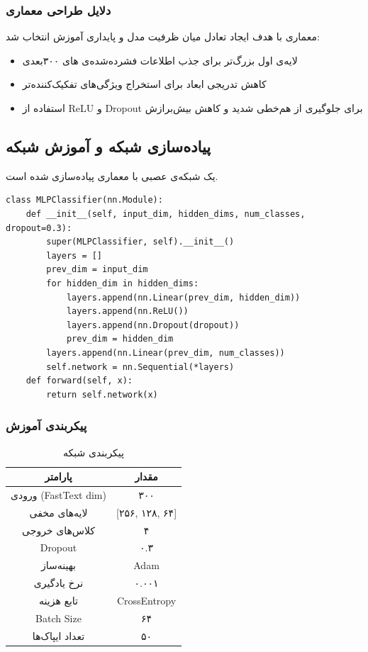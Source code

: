 \documentclass[12pt,a4paper]{article}
\begin{document}
\subsubsection{دلایل طراحی معماری }
معماری \lr{[256, 128, 64]} با هدف ایجاد تعادل میان ظرفیت مدل و پایداری آموزش انتخاب شد:
\begin{itemize}
\item لایه‌ی اول بزرگ‌تر برای جذب اطلاعات فشرده‌شده‌ی های ۳۰۰بعدی
\item کاهش تدریجی ابعاد برای استخراج ویژگی‌های تفکیک‌کننده‌تر
\item استفاده از ReLU و Dropout برای جلوگیری از هم‌خطی شدید و کاهش بیش‌برازش
\end{itemize}

\subsection{پیاده‌سازی شبکه و آموزش شبکه}
یک شبکه‌ی عصبی  با معماری \lr{[256, 128, 64]} پیاده‌سازی شده است.

\begin{lstlisting}[caption=کد مدل \lr{MLP}]
class MLPClassifier(nn.Module):
    def __init__(self, input_dim, hidden_dims, num_classes, dropout=0.3):
        super(MLPClassifier, self).__init__()
        layers = []
        prev_dim = input_dim
        for hidden_dim in hidden_dims:
            layers.append(nn.Linear(prev_dim, hidden_dim))
            layers.append(nn.ReLU())
            layers.append(nn.Dropout(dropout))
            prev_dim = hidden_dim
        layers.append(nn.Linear(prev_dim, num_classes))
        self.network = nn.Sequential(*layers)
    def forward(self, x):
        return self.network(x)
\end{lstlisting}

\subsubsection{پیکربندی آموزش}
\begin{table}[H]
\centering
\begin{tabular}{|c|c|}
\hline
\textbf{پارامتر} & \textbf{مقدار} \\
\hline
ورودی (FastText dim) & ۳۰۰ \\
لایه‌های مخفی & [۲۵۶, ۱۲۸, ۶۴] \\
کلاس‌های خروجی & ۴ \\
Dropout & ۰.۳ \\
بهینه‌ساز & Adam \\
نرخ یادگیری & ۰.۰۰۱ \\
تابع هزینه & CrossEntropy \\
Batch Size & ۶۴ \\
تعداد ایپاک‌ها & ۵۰ \\
\hline
\end{tabular}
\caption{پیکربندی شبکه }
\end{table}
\end{document}
